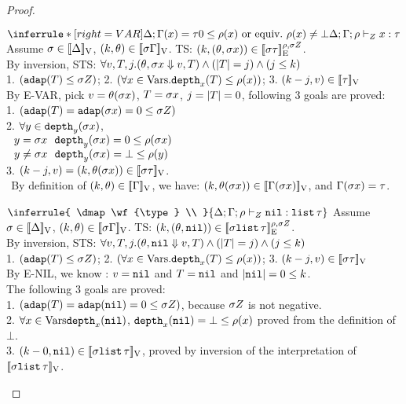\documentclass[a4paper,11pt]{article}
\theoremstyle{definition}
\begin{document}
\begin{proof}
\begin{mainitem}
\caseL
{
$   
	\inferrule*[right = VAR]{
      \Delta; \Gamma(x) = \type \\ 0 \leq \dmap(x) \mbox{ or equiv.\ } \dmap(x) \neq \bot
    }{
      \Delta; \Gamma; \dmap \tvdash{\nnatA} x: \type
    }
$
}
Assume $ \sigma \in [\![ \Delta ]\!]_{\text{V}}$, $(k, \theta) \in [\![ \sigma \Gamma ]\!]_{\text{V}}$. TS: $(k, (\theta, \sigma x)) \in [\![ \sigma \tau ]\!]_{\text{E}}^{\rho, \sigma Z}$.\\
%
By inversion, STS: $\forall v, T, j. (\theta, \sigma x \mathrel{\Downarrow} v, T) \land (|T| = j) \land (j \leq k) $\\
%
1. $ (\mathtt{adap}(T) \leq \sigma Z)$;
%
2. $(\forall x \in \mbox{Vars}. \mathtt{depth}_{x}(T) \leq \rho(x))$;
%
3. $(k - j, v) \in [\![ \tau ]\!]_{\text{V}}$\\
%
By E-VAR, pick $v = \theta(\sigma x)$, $T = \sigma x$, $j = |T| = 0$, following 3 goals are proved:\\
%
1. $(\mathtt{adap}(T) = \mathtt{adap}(\sigma x) = 0 \leq \sigma Z)$\\
%
2. $\forall y \in \mathtt{depth}_{y}(\sigma x)$, \\
$~~ y = \sigma x ~~ \mathtt{depth}_{y}(\sigma x) = 0 \leq \rho(\sigma x)$\\
$~~ y \neq \sigma x ~~ \mathtt{depth}_{y}(\sigma x) = \bot \leq \rho(y)$\\
%
3. $(k - j, v) = (k, \theta(\sigma x)) \in [\![ \sigma \tau ]\!]_{\text{V}}$.\\
$~~$By definition of $(k, \theta) \in [\![ \Gamma ]\!]_{\text{V}}$, we have: $(k, \theta(\sigma x))\in [\![ \Gamma(\sigma x) ]\!]_{\text{V}}$, and $\Gamma(\sigma x) = \tau$. 


\caseL
{
$    
 \inferrule{
     \dmap \wf{\type} \\
    }{
      \Delta; \Gamma; \dmap \tvdash{\nnatA} \enil: \tlist{\type}
    }
$
}
Assume $ \sigma \in [\![ \Delta ]\!]_{\text{V}}$, $(k, \theta) \in [\![ \sigma \Gamma ]\!]_{\text{V}}$. TS: $(k, (\theta, \mathtt{nil})) \in [\![ \sigma \mathtt{list} \, \tau ]\!]_{\text{E}}^{\rho, \sigma Z}$.\\
%
By inversion, STS: $\forall v, T, j. (\theta, \mathtt{nil} \mathrel{\Downarrow} v, T) \land (|T| = j) \land (j \leq k) $\\
%
1. $ (\mathtt{adap}(T) \leq \sigma Z)$;
%
2. $(\forall x \in \mbox{Vars}. \mathtt{depth}_{x}(T) \leq \rho(x))$;
%
3. $(k - j, v) \in [\![ \sigma \tau ]\!]_{\text{V}}$\\
%
By E-NIL, we know : $ v = \mathtt{nil} $ and $ T = \mathtt{nil}$ and $
|\mathtt{nil}| = 0 \leq k$. \\
The following 3 goals are proved:\\ 
%
1. $(\mathtt{adap}(T) = \mathtt{adap}(\mathtt{nil}) = 0 \leq \sigma Z)$, 
because $\sigma Z$ is not negative.\\
%
2. $\forall x \in \mbox{Vars} \mathtt{depth}_{x}(\mathtt{nil})$, 
$  \mathtt{depth}_{x}(\mathtt{nil}) = \bot \leq \rho(x)$ 
proved from the definition of $\bot$. \\
%
3. $(k - 0, \mathtt{nil}) \in [\![  \sigma \mathtt{list} \,  \tau  ]\!]_{\text{V}}$, 
proved by inversion of the interpretation of $[\![  \sigma \mathtt{list} \, \tau  ]\!]_{\text{V}} $.\\


\end{mainitem}
\end{proof}
\end{document}

